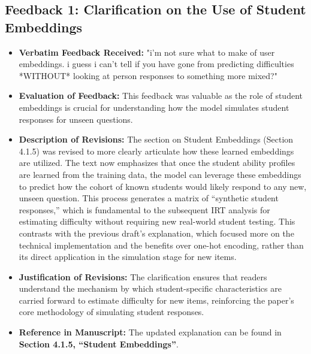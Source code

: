 \documentclass[
    a4paper, %
    10pt, %
    twoside, %
]{LTJournalArticle}
\begin{document}

\subsection*{Feedback 1: Clarification on the Use of Student Embeddings}
\begin{itemize}
    \item \textbf{Verbatim Feedback Received:} "i'm not sure what to make of user embeddings. i
    guess i can't tell if you have gone from predicting
    difficulties *WITHOUT* looking at person responses to
    something more mixed?"
    \item \textbf{Evaluation of Feedback:} This feedback was valuable as the role of student embeddings is crucial for understanding how the model simulates student responses for unseen questions.
    \item \textbf{Description of Revisions:} The section on Student Embeddings (Section 4.1.5) was revised to more clearly articulate how these learned embeddings are utilized. The text now emphasizes that once the student ability profiles are learned from the training data, the model can leverage these embeddings to predict how the cohort of known students would likely respond to any new, unseen question. This process generates a matrix of ``synthetic student responses,'' which is fundamental to the subsequent IRT analysis for estimating difficulty without requiring new real-world student testing. This contrasts with the previous draft's explanation, which focused more on the technical implementation and the benefits over one-hot encoding, rather than its direct application in the simulation stage for new items.
    \item \textbf{Justification of Revisions:} The clarification ensures that readers understand the mechanism by which student-specific characteristics are carried forward to estimate difficulty for new items, reinforcing the paper's core methodology of simulating student responses.
    \item \textbf{Reference in Manuscript:} The updated explanation can be found in \textbf{Section 4.1.5, ``Student Embeddings''}.
\end{itemize}
\end{document}
